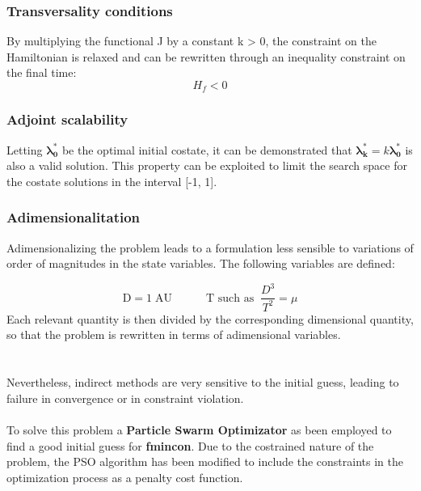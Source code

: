 \documentclass{report}
\begin{document}
\subsubsection{Transversality conditions}

By multiplying the functional J by a constant k > 0, the constraint on the Hamiltonian is relaxed and can be rewritten through an inequality constraint on the final time:
\begin{equation*}
    H_f < 0
\end{equation*}
\subsubsection{Adjoint scalability}
Letting $\boldsymbol{\lambda_0^*}$ be the optimal initial costate, it can be demonstrated that
$\boldsymbol{\lambda_k^*} = k \boldsymbol{\lambda_0^*}$ is also a valid solution. This property can be exploited to limit the search space for the 
costate solutions in the interval [-1, 1].

\subsubsection{Adimensionalitation}
Adimensionalizing the problem leads to a formulation less sensible to variations of order of magnitudes in the state variables. The following variables are defined:

\begin{equation*}
    \textrm{D} = 1 \; \textrm{AU} \quad \quad \quad \textrm{T such as} \; \; \frac{D^3}{T^2} = \mu 
\end{equation*}
Each relevant quantity is then divided by the corresponding dimensional quantity, so that the problem is rewritten in terms of adimensional variables.\\\\\\
Nevertheless, indirect methods are very sensitive to the initial guess, leading to failure in convergence or in constraint violation.\\\\ To solve this problem a \textbf {Particle Swarm Optimizator} as been 
employed to find a good initial guess for \textbf{fmincon}. Due to the costrained nature of the problem, the PSO algorithm has been modified to include the constraints in the optimization process as a penalty cost function. 
\end{document}
